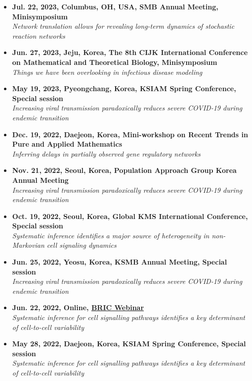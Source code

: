 \documentclass[margin,line]{res}
\begin{document}
\begin{resume}
\begin{itemize}[leftmargin=0pt, label={}]
    \item \textbf{Jul. 22, 2023, Columbus, OH, USA, SMB Annual Meeting, Minisymposium} \\
    \textit{Network translation allows for revealing long-term dynamics of stochastic reaction networks}
    \item \textbf{Jun. 27, 2023, Jeju, Korea, The 8th CIJK International Conference on Mathematical and Theoretical Biology, Minisymposium} \\
    \textit{Things we have been overlooking in infectious disease modeling}
    \item \textbf{May 19, 2023, Pyeongchang, Korea, KSIAM Spring Conference, Special session} \\
    \textit{Increasing viral transmission paradoxically reduces severe COVID-19 during endemic transition}
    \item \textbf{Dec. 19, 2022, Daejeon, Korea, Mini-workshop on Recent Trends in Pure and Applied Mathematics} \\
    \textit{Inferring delays in partially observed gene regulatory networks}
    \item \textbf{Nov. 21, 2022, Seoul, Korea, Population Approach Group Korea Annual Meeting} \\
    \textit{Increasing viral transmission paradoxically reduces severe COVID-19 during endemic transition}
    \item \textbf{Oct. 19, 2022, Seoul, Korea, Global KMS International Conference, Special session} \\
    \textit{Systematic inference identifies a major source of heterogeneity in non-Markovian cell signaling dynamics}
    \item \textbf{Jun. 25, 2022, Yeosu, Korea, KSMB Annual Meeting, Special session} \\
    \textit{Increasing viral transmission paradoxically reduces severe COVID-19 during endemic transition}
    \item \textbf{Jun. 22, 2022, Online, \href{https://www.ibric.org/bric/webinar/academic-all.do?mode=view&id=394}{BRIC Webinar}} \\
    \textit{Systematic inference for cell signalling pathways identifies a key determinant of cell-to-cell variability}
    \item \textbf{May 28, 2022, Daejeon, Korea, KSIAM Spring Conference, Special session} \\
    \textit{Systematic inference for cell signalling pathways identifies a key determinant of cell-to-cell variability}

\end{itemize}
\end{resume}
\end{document}
